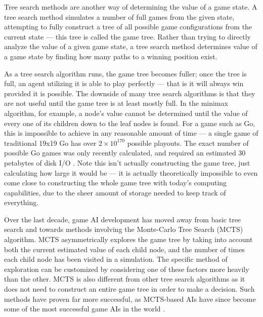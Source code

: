 Tree search methods are another way of determining the value of a game state.  A tree search method simulates a number of full games from the given state, attempting to fully construct a tree of all possible game configurations from the current state --- this tree is called the game tree.  Rather than trying to directly analyze the value of a given game state, a tree search method determines value of a game state by finding how many paths to a winning position exist.

As a tree search algorithm runs, the game tree becomes fuller; once the tree is full, an agent utilizing it is able to play perfectly --- that is it will always win provided it is possible.  The downside of many tree search algorithms is that they are not useful until the game tree is at least mostly full.  In the minimax algorithm, for example, a node's value cannot be determined until the value of every one of its children down to the leaf nodes is found.  For a game such as Go, this is impossible to achieve in any reasonable amount of time --- a single game of traditional 19x19 Go has over $2 \times 10^{170}$ possible playouts.  The exact number of possible Go games was only recently calculated, and required an estimated 30 petabytes of disk I/O \cite{Trompfinal}.  Note this isn't actually constructing the game tree, just calculating how large it would be --- it is actually theoretically impossible to even come close to constructing the whole game tree with today's computing capabilities, due to the sheer amount of storage needed to keep track of everything.

Over the last decade, game AI development has moved away from basic tree search and towards methods involving the Monte-Carlo Tree Search (MCTS) algorithm.  MCTS asymmetrically explores the game tree by taking into account both the current estimated value of each child node, and the number of times each child node has been visited in a simulation.  The specific method of exploration can be customized by considering one of these factors more heavily than the other.  MCTS is also different from other tree search algorithms as it does not need to construct an entire game tree in order to make a decision.  Such methods have proven far more successful, as MCTS-based AIs have since become some of the most successful game AIs in the world \cite{alphago}\cite{benzene}.

